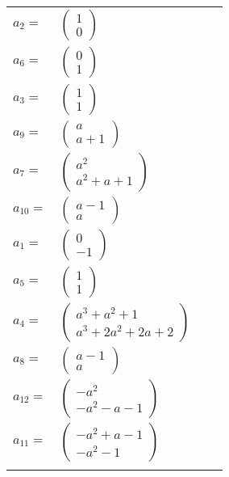 \documentclass[1p]{elsarticle_modified}
\theoremstyle{definition}
\begin{document}
\begin{tabular}{m{7pt} m{180pt} m{7pt} m{180pt} }
\flushright $a_{2}=$&$\begin{pmatrix}1\\0\end{pmatrix}$ \\
\flushright $a_{6}=$&$\begin{pmatrix}0\\1\end{pmatrix}$ \\
\flushright $a_{3}=$&$\begin{pmatrix}1\\1\end{pmatrix}$ \\
\flushright $a_{9}=$&$\begin{pmatrix}a\\a+1\end{pmatrix}$ \\
\flushright $a_{7}=$&$\begin{pmatrix}a^2\\a^2+a+1\end{pmatrix}$ \\
\flushright $a_{10}=$&$\begin{pmatrix}a-1\\a\end{pmatrix}$ \\
\flushright $a_{1}=$&$\begin{pmatrix}0\\-1\end{pmatrix}$ \\
\flushright $a_{5}=$&$\begin{pmatrix}1\\1\end{pmatrix}$ \\
\flushright $a_{4}=$&$\begin{pmatrix}a^3+a^2+1\\a^3+2 a^2+2 a+2\end{pmatrix}$ \\
\flushright $a_{8}=$&$\begin{pmatrix}a-1\\a\end{pmatrix}$ \\
\flushright $a_{12}=$&$\begin{pmatrix}- a^2\\- a^2- a-1\end{pmatrix}$ \\
\flushright $a_{11}=$&$\begin{pmatrix}- a^2+a-1\\- a^2-1\end{pmatrix}$\\&\end{tabular}
\end{document}
